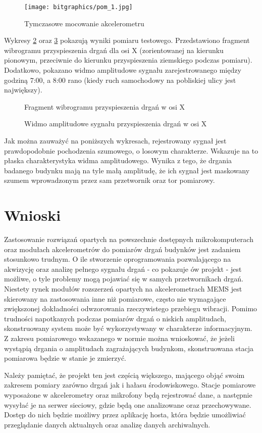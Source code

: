 \documentclass[a4paper,12pt]{mwart}
\let\Oldsection\section
\renewcommand{\section}{\FloatBarrier\Oldsection}
\begin{document}
\begin{figure}[!tbh]
  \centering
  \texttt{[image: bitgraphics/pom\_1.jpg]}
  \caption{Tymczasowe mocowanie akcelerometru}
  \label{fig:imadlo}
\end{figure}

Wykresy \ref{plot:accel_x} oraz \ref{plot:power_x} pokazują wyniki pomiaru
testowego. Przedstawiono fragment wibrogramu przyspieszenia drgań dla osi X
(zorientowanej na kierunku pionowym, przeciwnie do kierunku przyspieszenia
ziemskiego podczas pomiaru). Dodatkowo, pokazano widmo amplitudowe sygnału
zarejestrowanego między godziną 7:00, a 8:00 rano (kiedy ruch samochodowy na
pobliskiej ulicy jest największy).

\begin{figure}[!tbh]
  \centering
  
  \caption{Fragment wibrogramu przyspieszenia drgań w osi X}
  \label{plot:accel_x}
\end{figure}

\begin{figure}[!tbh]
  \centering
  
  \caption{Widmo amplitudowe sygnału przyspieszenia drgań w osi X}
  \label{plot:power_x}
\end{figure}

Jak można zauważyć na poniższych wykresach, rejestrowany sygnał jest
prawdopodobnie pochodzenia szumowego, o losowym charakterze. Wskazuje na to
płaska charakterystyka widma amplitudowego. Wynika z tego, że drgania badanego
budynku mają na tyle małą amplitudę, że ich sygnał jest maskowany szumem
wprowadzonym przez sam przetwornik oraz tor pomiarowy.

\section{Wnioski}

Zastosowanie rozwiązań opartych na powszechnie dostępnych mikrokomputerach oraz
modułach akcelerometrów do pomiarów drgań budynków jest zadaniem stosunkowo
trudnym. O ile stworzenie oprogramowania pozwalającego na akwizycję oraz analizę
pełnego sygnału drgań - co pokazuje ów projekt - jest możliwe, o tyle problemy
mogą pojawiać się w samych przetwornikach drgań. Niestety rynek modułów
rozszerzeń opartych na akcelerometrach MEMS jest skierowany na zastosowania inne
niż pomiarowe, często nie wymagające zwiększonej dokładności odwzorowania
rzeczywistego przebiegu wibracji. Pomimo trudności napotkanych podczas pomiarów
drgań o niskich amplitudach, skonstruowany system może być wykorzystywany w
charakterze informacyjnym. Z zakresu pomiarowego wskazanego w normie można
wnioskować, że jeżeli wystąpią drgania o amplitudach zagrażających budynkom,
skonstruowana stacja pomiarowa będzie w stanie je zmierzyć.

Należy pamiętać, że projekt ten jest częścią większego, mającego objąć swoim
zakresem pomiary zarówno drgań jak i hałasu środowiskowego. Stacje pomiarowe
wyposażone w akcelerometry oraz mikrofony będą rejestrować dane, a następnie
wysyłać je na serwer sieciowy, gdzie będą one analizowane oraz przechowywane.
Dostęp do nich będzie możliwy przez aplikację hosta, która będzie umożliwiać
przeglądanie danych aktualnych oraz analizę danych archiwalnych.

\printbibliography[title=Bibliografia]
\end{document}
